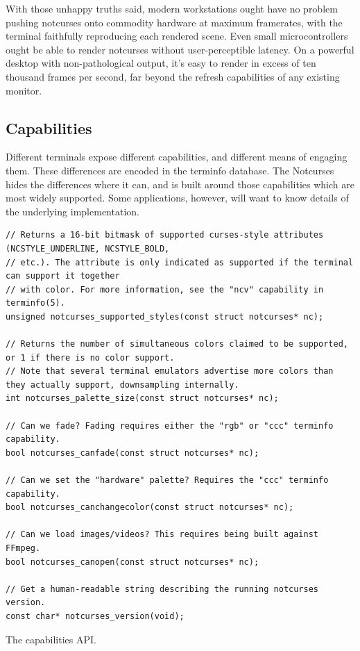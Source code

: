 \documentclass[letterpaper,10pt]{article}
\begin{document}
With those unhappy truths said, modern workstations ought have no problem pushing
notcurses onto commodity hardware at maximum framerates, with the terminal
faithfully reproducing each rendered scene. Even small microcontrollers ought
be able to render notcurses without user-perceptible latency. On a powerful
desktop with non-pathological output, it's easy to render in excess of
ten thousand frames per second, far beyond the refresh capabilities of any
existing monitor.

\subsection{Capabilities}
Different terminals expose different capabilities, and different means of
engaging them. These differences are encoded in the terminfo database\cite{terminfo}.
The Notcurses hides the differences where it can, and is built around those
capabilities which are most widely supported. Some applications, however, will
want to know details of the underlying implementation.
\begin{listing}[!htbp]
\begin{verbatim}
// Returns a 16-bit bitmask of supported curses-style attributes (NCSTYLE_UNDERLINE, NCSTYLE_BOLD,
// etc.). The attribute is only indicated as supported if the terminal can support it together
// with color. For more information, see the "ncv" capability in terminfo(5).
unsigned notcurses_supported_styles(const struct notcurses* nc);

// Returns the number of simultaneous colors claimed to be supported, or 1 if there is no color support.
// Note that several terminal emulators advertise more colors than they actually support, downsampling internally.
int notcurses_palette_size(const struct notcurses* nc);

// Can we fade? Fading requires either the "rgb" or "ccc" terminfo capability.
bool notcurses_canfade(const struct notcurses* nc);

// Can we set the "hardware" palette? Requires the "ccc" terminfo capability.
bool notcurses_canchangecolor(const struct notcurses* nc);

// Can we load images/videos? This requires being built against FFmpeg.
bool notcurses_canopen(const struct notcurses* nc);

// Get a human-readable string describing the running notcurses version.
const char* notcurses_version(void);
\end{verbatim}
\caption{The capabilities API.}
\end{listing}
\end{document}
